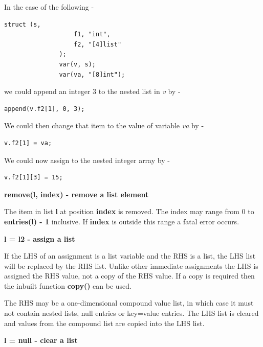             In the case of the following -
            
            \begin{lstlisting}[gobble=12, language=threepl]
               struct (s,
                   f1, "int",
                   f2, "[4]list"
               );
               var(v, s);
               var(va, "[8]int");
            \end{lstlisting}
            we could append an integer 3 to the nested list in {\em v} by -
            \begin{lstlisting}[gobble=12, language=threepl]
               append(v.f2[1], 0, 3);
            \end{lstlisting}
            We could then change that item to the value of variable {\em va}
            by -
            \begin{lstlisting}[gobble=12, language=threepl]
               v.f2[1] = va;
            \end{lstlisting}
            We could now assign to the nested integer array by -
            \begin{lstlisting}[gobble=12, language=threepl]
               v.f2[1][3] = 15;
            \end{lstlisting}


            {\bf remove(l, index) - remove a list element}

            The item in list {\bf l} at position {\bf index} is removed.
            The index may range from 0 to {\bf entries(l) - 1}
            inclusive. If {\bf index} is outside this range a fatal error
            occurs.
            


            {\bf l = l2 - assign a list}

            If the LHS of an assignment is a list variable and the RHS is a
            list, the LHS list will be replaced by the RHS list. Unlike other
            immediate assignments the LHS is assigned the RHS value, not a copy
            of the RHS value. If a copy is required then the inbuilt function
            {\bf copy()}  can be used.

            The RHS may be a one-dimensional compound value list, in which case it
            must not contain nested lists, null entries or key=value entries.
            The LHS list is cleared and values from the compound list are
            copied into the LHS list.


            {\bf l = null - clear a list}

